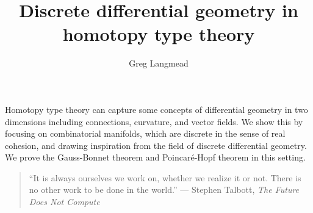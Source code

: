 \documentclass[12pt,fleqn]{article}
\title{Discrete differential geometry in homotopy type theory}
\author{Greg Langmead}
\renewenvironment{abstract}{\section*{\abstractname}}{}
\begin{document}
\maketitle

\begin{abstract}
Homotopy type theory can capture some concepts of differential geometry in two dimensions including connections, curvature, and vector fields. We show this by focusing on combinatorial manifolds, which are discrete in the sense of real cohesion\cite{shulman_cohesion}, and drawing inspiration from the field of discrete differential geometry. We prove the Gauss-Bonnet theorem and Poincaré-Hopf theorem in this setting.
\end{abstract}

\begin{quote} 
\centering
``It is always ourselves we work on, whether we realize it or not. There is no other work to be done in the world.'' --- Stephen Talbott, \emph{The Future Does Not Compute}\cite{talbott}
\end{quote}












\end{document}
